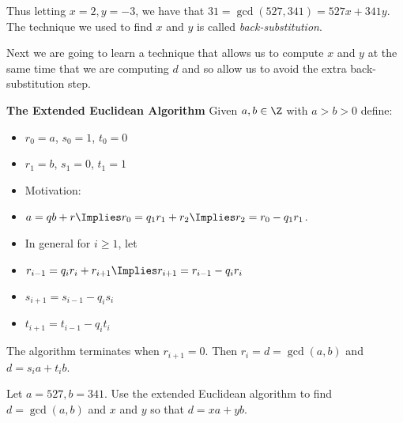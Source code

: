 \documentclass[oneside,12pt]{amsart}
\begin{document}
\bigskip

Thus letting $x=2, y=-3$, we have that $31 = \gcd(527,341) = 527x + 341y$.
The technique we used to find $x$ and $y$ is called \emph{back-substitution}.

\bigskip

Next we are going to learn a technique that allows us to compute $x$ and $y$ at the same time that
we are computing $d$ and so allow us to avoid the extra back-substitution step.

\bigskip


\textbf{The Extended Euclidean Algorithm} Given $a,b\in\Z$ with $a>b>0$ define:

\begin{itemize}
\item $r_0=a$,  $s_0 = 1$, $t_0 = 0$
\item $r_1=b$, $s_1 = 0$, $t_1 = 1$
\item Motivation:
\item $a = qb + r \Implies r_0 = q_1 r_1 + r_2 \Implies r_2 = r_0 - q_1 r_1$.
\item In general for $i\geq 1$, let
\item $r_{i-1} = q_i r_i + r_{i+1}  \Implies r_{i+1} = r_{i-1} - q_i r_i$
\item $s_{i+1} = s_{i-1} - q_i s_i$
\item $t_{i+1} = t_{i-1} - q_i t_i$
\end{itemize}

The algorithm terminates when $r_{i+1}=0$. Then $r_i = d = \gcd(a,b)$ and $d = s_i a + t_i b$.

\bigskip

\begin{example} Let $a=527, b=341$. Use the extended Euclidean algorithm to find $d=\gcd(a,b)$ and $x$ and $y$ so
that $d=xa+yb$.
\end{example}

\bigskip
\end{document}
